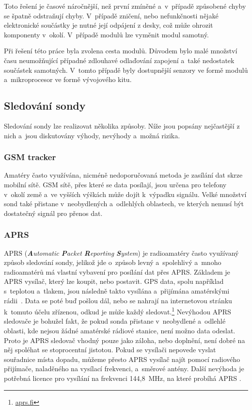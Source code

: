 \documentclass[twoside]{ctuthesis}
\theoremstyle{plain}
\theoremstyle{definition}
\theoremstyle{note}
\begin{document}
			Toto řešení je časové náročnější, než první zmíněné a~v~případě způsobené chyby se špatně odstraňují chyby. V~případě zničení, nebo nefunkčnosti nějaké elektronické součástky je nutné její odpájení z desky, což může ohrozit komponenty v~okolí. V~případě modulů lze vyměnit modul samotný.

			Při řešení této práce byla zvolena cesta modulů. Důvodem bylo malé množství času neumožňující případné zdlouhavé odlaďování zapojení a~také nedostatek součástek samotných. V~tomto případě byly dostupnější senzory ve formě modulů a~mikroprocesor ve formě vývojového kitu. 

			
		\subsection{Sledování sondy}
		Sledování sondy lze realizovat několika způsoby. Níže jsou popsány nejčastější z nich a~jsou diskutovány výhody, nevýhody a~možná rizika.

				\subsubsection{GSM tracker}
				Amatéry často využívána, nicméně nedoporučovaná metoda \cite{web_sledovani} je zasílání dat skrze mobilní sítě. GSM sítě, přes které se data posílají, jsou určena pro telefony v~okolí země a~ve vyšších výškách může dojít k~výpadku signálu. Velké množství sond také přistane v~neobydlených a~odlehlých oblastech, ve kterých nemusí být dostatečný signál pro přenos dat.


				\subsubsection{APRS}
				APRS (\textit{\textbf{A}utomatic \textbf{P}acket \textbf{R}eporting \textbf{S}ystem}) je radioamatéry často využívaný způsob sledování sondy, jelikož jde o~způsob levný a~spolehlivý a~mnoho radioamatérů má vlastní vybavení pro posílání dat přes APRS. Základem je APRS vysílač, který lze koupit, nebo postavit. GPS data, spolu například s~teplotou a~tlakem, jsou následně takto vysílána a~přijímána amatérskými rádii~\cite{web_sledovani}. Data se poté buď pošlou dál, nebo se nahrají na internetovou stránku k~tomuto účelu zřízenou, odkud je může každý sledovat.\footnote{\url{aprs.fi}}
				Nevýhodou APRS sledovače je bohužel fakt, že pokud sonda přistane v~neobydlené a~odlehlé oblasti, kde nejsou žádné amatérské rádiové stanice, není možno data odeslat. Proto je APRS sledovač vhodný pouze jako záloha, nebo doplnění, není dobré na něj spoléhat se stoprocentní jistotou. Pokud se vysílači nepovede vyslat souřadnice místa dopadu, můžeme přesto APRS vysílač najít pomocí radiového přijímače, naladěného na vysílací frekvenci, a~směrové antény. Další nevýhoda je potřebná licence pro vysílání na frekvenci 144,8~MHz, na které probíhá APRS \cite{web_ctu}.
\end{document}

